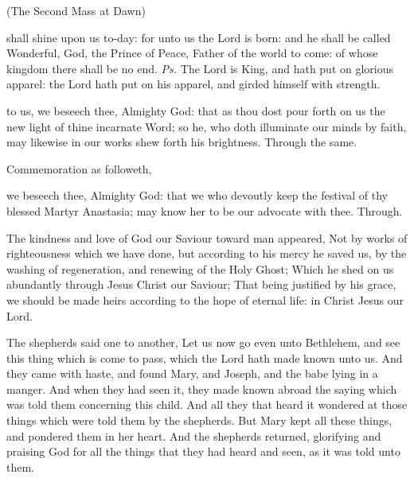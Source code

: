 \begin{inhead}
	(The Second Mass at Dawn)
\end{inhead}

\introit
{} shall shine upon us to-day: for unto us the Lord is born: and he shall be called Wonderful, God, the Prince of Peace, Father of the world to come: of whose kingdom there shall be no end. \textit{Ps.} The Lord is King, and hath put on glorious apparel: the Lord hath put on his apparel, and girded himself with strength.

\collect
{} to us, we beseech thee, Almighty God: that as thou dost pour forth on us the new light of thine incarnate Word; so he, who doth illuminate our minds by faith, may likewise in our works shew forth his brightness. Through the same.
\begin{rubric}
	Commemoration  as followeth,
\end{rubric}
 we beseech thee, Almighty God: that we who devoutly keep the festival of thy blessed Martyr Anastasia; may know her to be our advocate with thee. Through.

 The kindness and love of God our Saviour toward man appeared, Not by works of righteousness which we have done, but according to his mercy he saved us, by the washing of regeneration, and renewing of the Holy Ghost; Which he shed on us abundantly through Jesus Christ our Saviour; That being justified by his grace, we should be made heirs according to the hope of eternal life: in Christ Jesus our Lord.


\clearpage
{}
 The shepherds said one to another, Let us now go even unto Bethlehem, and see this thing which is come to pass, which the Lord hath made known unto us. And they came with haste, and found Mary, and Joseph, and the babe lying in a manger. And when they had seen it, they made known abroad the saying which was told them concerning this child. And all they that heard it wondered at those things which were told them by the shepherds. But Mary kept all these things, and pondered them in her heart. And the shepherds returned, glorifying and praising God for all the things that they had heard and seen, as it was told unto them.

